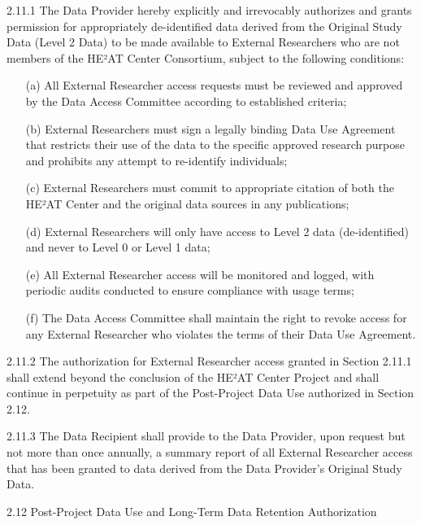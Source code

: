 \documentclass[12pt,letterpaper]{article}
\newcommand{\added}[1]{\textcolor{addcolor}{#1}}
\begin{document}
\added{2.11.1 The Data Provider hereby explicitly and irrevocably authorizes and grants permission for appropriately de-identified data derived from the Original Study Data (Level 2 Data) to be made available to External Researchers who are not members of the HE²AT Center Consortium, subject to the following conditions:
\begin{enumerate}
\item[(a)] All External Researcher access requests must be reviewed and approved by the Data Access Committee according to established criteria;
\item[(b)] External Researchers must sign a legally binding Data Use Agreement that restricts their use of the data to the specific approved research purpose and prohibits any attempt to re-identify individuals;
\item[(c)] External Researchers must commit to appropriate citation of both the HE²AT Center and the original data sources in any publications;
\item[(d)] External Researchers will only have access to Level 2 data (de-identified) and never to Level 0 or Level 1 data;
\item[(e)] All External Researcher access will be monitored and logged, with periodic audits conducted to ensure compliance with usage terms;
\item[(f)] The Data Access Committee shall maintain the right to revoke access for any External Researcher who violates the terms of their Data Use Agreement.
\end{enumerate}}

\added{2.11.2 The authorization for External Researcher access granted in Section 2.11.1 shall extend beyond the conclusion of the HE²AT Center Project and shall continue in perpetuity as part of the Post-Project Data Use authorized in Section 2.12.}

\added{2.11.3 The Data Recipient shall provide to the Data Provider, upon request but not more than once annually, a summary report of all External Researcher access that has been granted to data derived from the Data Provider's Original Study Data.}

\added{2.12 Post-Project Data Use and Long-Term Data Retention Authorization}
\end{document}
